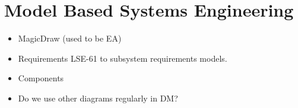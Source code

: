 \section{Model Based Systems Engineering}

\begin{itemize}
  \item MagicDraw (used to be EA)
  \item Requirements LSE-61 to subsystem requirements models.
  \item Components
  \item Do we use other diagrams regularly in DM?
\end{itemize}
